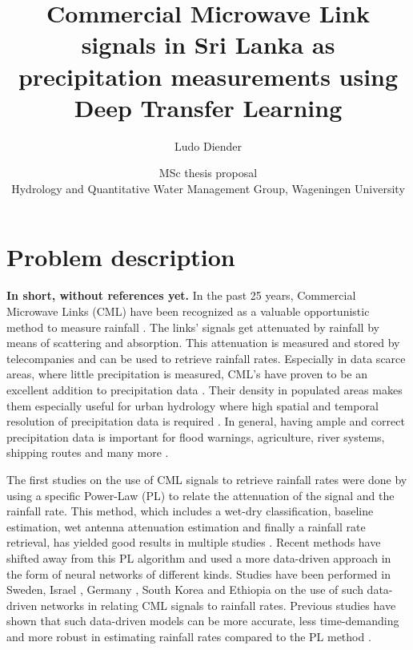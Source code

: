 \documentclass[twocolumn, 10pt, a4paper]{article}
\begin{document}
	
	\title{\vspace{-1cm}\Huge{Commercial Microwave Link signals in Sri Lanka as precipitation measurements using Deep Transfer Learning}}
	\author{\Large{Ludo Diender}}
	\date{\normalsize{MSc thesis proposal\\
			Hydrology and Quantitative Water Management Group,
			Wageningen University}}
	
	\maketitle
	
	\section{Problem description}
	
	\textbf{In short, without references yet.}
	In the past 25 years, Commercial Microwave Links (CML) have been recognized as a valuable opportunistic method to measure rainfall \cite{Leijnse2007} \cite{Ruf1996}. The links' signals get attenuated by rainfall by means of scattering and absorption. This attenuation is measured and stored by telecompanies and can be used to retrieve rainfall rates. Especially in data scarce areas, where little precipitation is measured, CML's have proven to be an excellent addition to precipitation data \cite{Overeem2021,Doumounia2014,Diba2021}. Their density in populated areas makes them especially useful for urban hydrology where high spatial and temporal resolution of precipitation data is required \cite{Overeem2011}. In general, having ample and correct precipitation data is important for flood warnings, agriculture, river systems, shipping routes and many more \cite{Chwala2019}. 
	
	The first studies on the use of CML signals to retrieve rainfall rates were done by using a specific Power-Law (PL) to relate the attenuation of the signal and the rainfall rate. This method, which includes a wet-dry classification, baseline estimation, wet antenna attenuation estimation and finally a rainfall rate retrieval, has yielded good results in multiple studies \cite{deVos2019,Graf2020,Fencl2017}. Recent methods have shifted away from this PL algorithm and used a more data-driven approach in the form of neural networks of different kinds. Studies have been performed in Sweden, Israel \cite{Habi2019}, Germany \cite{Polz2020}, South Korea and Ethiopia \cite{Diba2021} on the use of such data-driven networks in relating CML signals to rainfall rates. Previous studies have shown that such data-driven models can be more accurate, less time-demanding and more robust in estimating rainfall rates compared to the PL method \cite{Polz2020,Pudashine2020}. 
	
\end{document}
